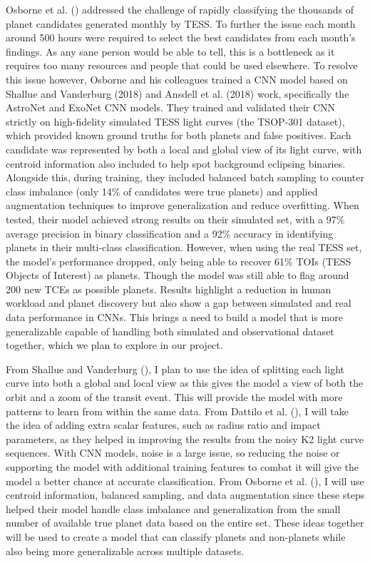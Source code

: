 \documentclass[letterpaper]{article} %
\begin{document}
Osborne et al. (\citeyear{Osborn2019rapidclassificationtesscandidates}) addressed the challenge of rapidly classifying the thousands of planet candidates generated monthly by TESS. To further the issue each month around 500 hours were required to select the best candidates from each month's findings. As any sane person would be able to tell, this is a bottleneck as it requires too many resources and people that could be used elsewhere. To resolve this issue however, Osborne and his colleagues trained a CNN model based on Shallue and Vanderburg (2018) and Ansdell et al. (2018) work, specifically the AstroNet and ExoNet CNN models. They trained and validated their CNN strictly on high-fidelity simulated TESS light curves (the TSOP-301 dataset), which provided known ground truths for both planets and false positives. Each candidate was represented by both a local and global view of its light curve, with centroid information also included to help spot background eclipsing binaries. Alongside this, during training, they included balanced batch sampling to counter class imbalance (only 14\% of candidates were true planets) and applied augmentation techniques to improve generalization and reduce overfitting. When tested, their model achieved strong results on their simulated set, with a 97\% average precision in binary classification and a 92\% accuracy in identifying planets in their multi-class classification. However, when using the real TESS set, the model’s performance dropped, only being able to recover 61\% TOIs (TESS Objects of Interest) as planets. Though the model was still able to flag around 200 new TCEs as possible planets. Results highlight a reduction in human workload and planet discovery but also show a gap between simulated and real data performance in CNNs. This brings a need to build a model that is more generalizable capable of handling both simulated and observational dataset together, which we plan to explore in our project.

From Shallue and Vanderburg (\citeyear{Shallue2018identifyexoplanetsI}), I plan to use the idea of splitting each light curve into both a global and local view as this gives the model a view of both the orbit and a zoom of the transit event. This will provide the model with more patterns to learn from within the same data. From Dattilo et al. (\citeyear{Dattilo2019identifyexoplanetsII}), I will take the idea of adding extra scalar features, such as radius ratio and impact parameters, as they helped in improving the results from the noisy K2 light curve sequences. With CNN models, noise is a large issue, so reducing the noise or supporting the model with additional training features to combat it will give the model a better chance at accurate classification. From Osborne et al. (\citeyear{Osborn2019rapidclassificationtesscandidates}), I will use centroid information, balanced sampling, and data augmentation since these steps helped their model handle class imbalance and generalization from the small number of available true planet data based on the entire set. These ideas together will be used to create a model that can classify planets and non-planets while also being more generalizable across multiple datasets.
\end{document}
